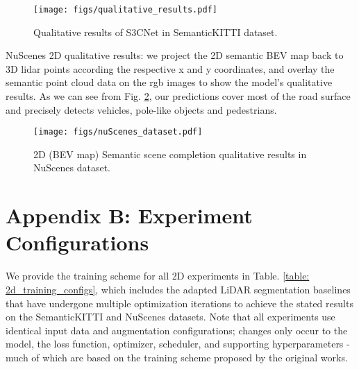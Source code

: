 \documentclass{article}
\begin{document}
\begin{figure}[tbh]
    \centering
    \texttt{[image: figs/qualitative\_results.pdf]}
    \caption{Qualitative results of S3CNet in SemanticKITTI dataset.}
    \label{fig:qualitative_result}
\end{figure}


NuScenes 2D qualitative results: we project the 2D semantic BEV map back to 3D lidar points according the respective x and y coordinates, and overlay the semantic point cloud data on the rgb images to show the model's qualitative results. As we can see from Fig. \ref{fig:2d_bev_nuscenes}, our predictions cover most of the road surface and precisely detects vehicles, pole-like objects and pedestrians. 

\begin{figure}[htb]
    \centering
    \texttt{[image: figs/nuScenes\_dataset.pdf]}
    \caption{2D (BEV map) Semantic scene completion qualitative results in NuScenes dataset. }
    \label{fig:2d_bev_nuscenes}
\end{figure}


\section{Appendix B: Experiment Configurations}

We provide the training scheme for all 2D experiments in Table. \ref{table: 2d_training_configs}, which includes the adapted LiDAR segmentation baselines that have undergone multiple optimization iterations to achieve the stated results on the SemanticKITTI and NuScenes datasets. Note that all experiments use identical input data and augmentation configurations; changes only occur to the model, the loss function, optimizer, scheduler, and supporting hyperparameters - much of which are based on the training scheme proposed by the original works.
\end{document}
